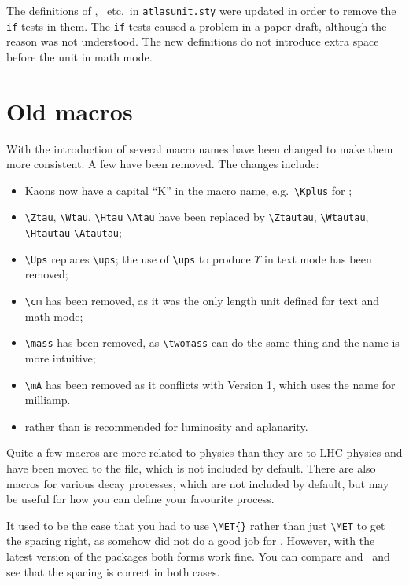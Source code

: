 The definitions of \MeV, \GeV\ etc.\ in \texttt{atlasunit.sty} were updated in order to remove the \texttt{if} tests in them.
The \texttt{if} tests caused a problem in a paper draft, although the reason was not understood.
The new definitions do not introduce extra space before the unit in math mode.


\section{Old macros}
\label{sec:old}

With the introduction of  several macro names have been changed to make them more consistent.
A few have been removed. The changes include:
\begin{itemize}
\item Kaons now have a capital \enquote{K} in the macro name, e.g.\ \verb|\Kplus| for \Kplus;
\item \verb|\Ztau|, \verb|\Wtau|, \verb|\Htau| \verb|\Atau| have been replaced by
  \verb|\Ztautau|, \verb|\Wtautau|, \verb|\Htautau| \verb|\Atautau|;
\item \verb|\Ups| replaces \verb|\ups|;
  the use of \verb|\ups| to produce $\Upsilon$ in text mode has been removed;
\item \verb|\cm| has been removed, as it was the only length unit defined for text and math mode;
\item \verb|\mass| has been removed, as \verb|\twomass| can do the same thing and the name is more intuitive;
\item \verb|\mA| has been removed as it conflicts with  Version 1, which uses the name
  for milliamp.
\item {} rather than  is recommended for luminosity and aplanarity.
\end{itemize}

Quite a few macros are more related to \Zboson physics than they are to LHC physics and have
been moved to the  file, which is not included by default.
There are also macros for various decay processes,  which are not included by default,
but may be useful for how you can define your favourite process.

It used to be the case that you had to use \verb|\MET{}| rather than just \verb|\MET| to get the spacing right,
as somehow  did not do a good job for \met.
However, with the latest version of the packages both forms work fine.
You can compare \MET and \MET\ and see that the spacing is correct in both cases.
